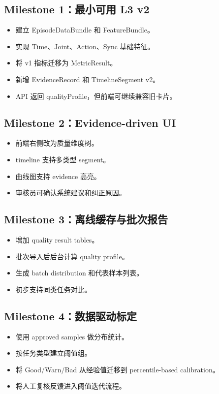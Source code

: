 \documentclass[UTF8,zihao=-4]{ctexart}
\begin{document}
\subsection{Milestone 1：最小可用 L3 v2}

\begin{itemize}
\item 建立 EpisodeDataBundle 和 FeatureBundle。
\item 实现 Time、Joint、Action、Sync 基础特征。
\item 将 v1 指标迁移为 MetricResult。
\item 新增 EvidenceRecord 和 TimelineSegment v2。
\item API 返回 qualityProfile，但前端可继续兼容旧卡片。
\end{itemize}

\subsection{Milestone 2：Evidence-driven UI}

\begin{itemize}
\item 前端右侧改为质量维度树。
\item timeline 支持多类型 segment。
\item 曲线图支持 evidence 高亮。
\item 审核员可确认系统建议和纠正原因。
\end{itemize}

\subsection{Milestone 3：离线缓存与批次报告}

\begin{itemize}
\item 增加 quality result tables。
\item 批次导入后后台计算 quality profile。
\item 生成 batch distribution 和代表样本列表。
\item 初步支持同类任务对比。
\end{itemize}

\subsection{Milestone 4：数据驱动标定}

\begin{itemize}
\item 使用 approved samples 做分布统计。
\item 按任务类型建立阈值组。
\item 将 Good/Warn/Bad 从经验值迁移到 percentile-based calibration。
\item 将人工复核反馈进入阈值迭代流程。
\end{itemize}
\end{document}
